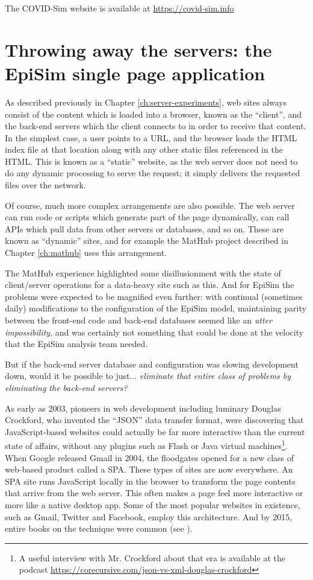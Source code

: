 The COVID-Sim website is available at \url{https://covid-sim.info}

\hypertarget{covid-throw-away-the-servers}{%
\section{Throwing away the servers: the EpiSim single page application}\label{covid-throw-away-the-servers}}

As described previously in Chapter \ref{ch:server-experiments}, web sites always consist of the content which is loaded into a browser, known as the ``client'', and the back-end servers which the client connects to in order to receive that content. In the simplest case, a user points to a URL, and the browser loads the HTML index file at that location along with any other static files referenced in the HTML. This is known as a ``static'' website, as the web server does not need to do any dynamic processing to serve the request; it simply delivers the requested files over the network.

Of course, much more complex arrangements are also possible. The web server can run code or scripts which generate part of the page dynamically, can call APIs which pull data from other servers or databases, and so on. These are known as ``dynamic'' sites, and for example the MatHub project described in Chapter \ref{ch:mathub} uses this arrangement.

The MatHub experience highlighted some disillusionment with the state of client/server operations for a data-heavy site such as this. And for EpiSim the problems were expected to be magnified even further: with continual (sometimes daily) modifications to the configuration of the EpiSim model, maintaining parity between the front-end code and back-end databases seemed like an \emph{utter impossibility}, and was certainly not something that could be done at the velocity that the EpiSim analysis team needed.

But if the back-end server database and configuration was slowing development down, would it be possible to just... \emph{eliminate that entire class of problems by eliminating the back-end servers?}

As early as 2003, pioneers in web development including luminary Douglas Crockford, who invented the ``JSON'' data transfer format, were discovering that JavaScript-based websites could actually be far more interactive than the current state of affairs, without any plugins such as Flash or Java virtual machines\footnote{A useful interview with Mr. Crockford about that era is available at the podcast \url{https://corecursive.com/json-vs-xml-douglas-crockford}}. When Google released Gmail in 2004, the floodgates opened for a new class of web-based product called a \gls{SPA}. These types of sites are now everywhere. An SPA site runs JavaScript locally in the browser to transform the page contents that arrive from the web server. This often makes a page feel more interactive or more like a native desktop app. Some of the most popular websites in existence, such as Gmail, Twitter and Facebook, employ this architecture. And by 2015, entire books on the technique were common (see \cite{Scott2015spa}).

